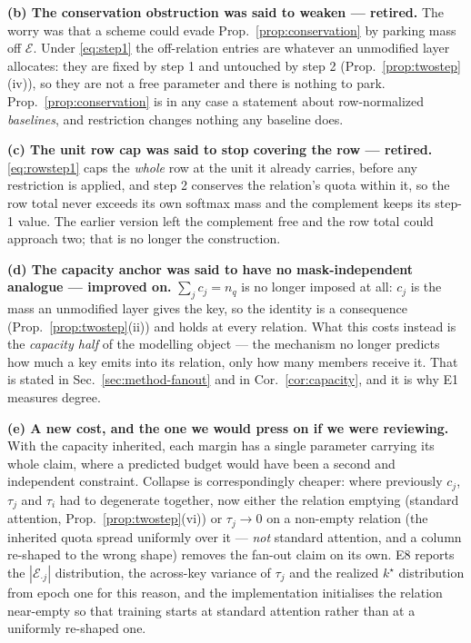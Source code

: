 \documentclass{article}
\begin{document}
\textbf{(b) The conservation obstruction was said to weaken --- retired.} The worry was that a
scheme could evade Prop.~\ref{prop:conservation} by parking mass off $\mathcal{E}$. Under
\eqref{eq:step1} the off-relation entries are whatever an unmodified layer allocates: they are
fixed by step 1 and untouched by step 2 (Prop.~\ref{prop:twostep}(iv)), so they are not a free
parameter and there is nothing to park. Prop.~\ref{prop:conservation} is in any case a statement
about row-normalized \emph{baselines}, and restriction changes nothing any baseline does.

\textbf{(c) The unit row cap was said to stop covering the row --- retired.}
\eqref{eq:rowstep1} caps the \emph{whole} row at the unit it already carries, before any
restriction is applied, and step 2 conserves the relation's quota within it, so the row total
never exceeds its own softmax mass and the complement keeps its step-1 value. The earlier version left the complement free and the row total
could approach two; that is no longer the construction.

\textbf{(d) The capacity anchor was said to have no mask-independent analogue --- improved on.}
$\sum_j c_j=n_q$ is no longer imposed at all: $c_j$ is the mass an unmodified layer gives the key,
so the identity is a consequence (Prop.~\ref{prop:twostep}(ii)) and holds at every relation. What
this costs instead is the \emph{capacity half} of the modelling object --- the mechanism no longer
predicts how much a key emits into its relation, only how many members receive it. That is stated
in Sec.~\ref{sec:method-fanout} and in Cor.~\ref{cor:capacity}, and it is why E1 measures degree.

\textbf{(e) A new cost, and the one we would press on if we were reviewing.} With the capacity
inherited, each margin has a single parameter carrying its whole claim, where a predicted budget
would have been a second and independent constraint. Collapse is correspondingly cheaper: where previously $c_j$, $\tau_j$ and $\tau_i$ had to
degenerate together, now either the relation emptying (standard attention,
Prop.~\ref{prop:twostep}(vi)) or $\tau_j\to0$ on a non-empty relation (the inherited quota
spread uniformly over it --- \emph{not} standard attention, and a column re-shaped to the wrong
shape) removes the fan-out claim on its own. E8 reports the $|\mathcal{E}_{\cdot j}|$
distribution, the across-key variance of $\tau_j$ and the realized $k^\star$ distribution from
epoch one for this reason, and the implementation initialises the relation near-empty so that
training starts at standard attention rather than at a uniformly re-shaped one.
\end{document}
